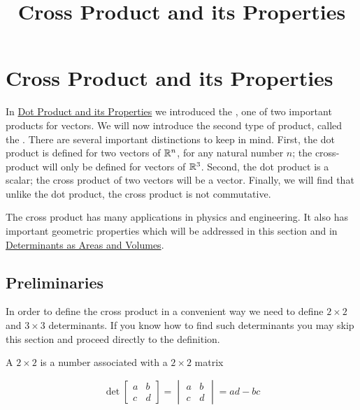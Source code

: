 \documentclass{ximera}
\title{Cross Product and its Properties} \license{CC BY-NC-SA 4.0}
\begin{document}
\begin{abstract}
\end{abstract}
\maketitle
\section*{Cross Product and its Properties}
In \href{https://ximera.osu.edu/oerlinalg/LinearAlgebra/VEC-0050/main}{Dot Product and its Properties} we introduced the , one of two important products for vectors.  We will now introduce the second type of product, called the .  There are several important distinctions to keep in mind.  First, the dot product is defined for two vectors of $\mathbb{R}^n$, for any  natural number $n$; the cross-product will only be defined for vectors of $\mathbb{R}^3$.  Second, the dot product is a scalar; the cross product of two vectors will be a vector.  Finally, we will find that unlike the dot product, the cross product is not commutative.  

The cross product has many applications in physics and engineering.  It also has important geometric properties which will be addressed in this section and in \href{https://ximera.osu.edu/oerlinalg/LinearAlgebra/DET-0070/main}{Determinants as Areas and Volumes}.

\subsection*{Preliminaries}
In order to define the cross product in a convenient way we need to define $2\times 2$ and $3\times 3$ determinants.  If you know how to find such determinants you may skip this section and proceed directly to the definition.

\begin{definition}\label{def:twodetcrossprod}
A $2\times 2$  is a number associated with a $2\times 2$ matrix

$$\det{\begin{bmatrix}
a & b\\
c & d
\end{bmatrix}}=\begin{vmatrix}
a & b\\
c & d
\end{vmatrix} =ad-bc$$

\end{definition}
\end{document}
